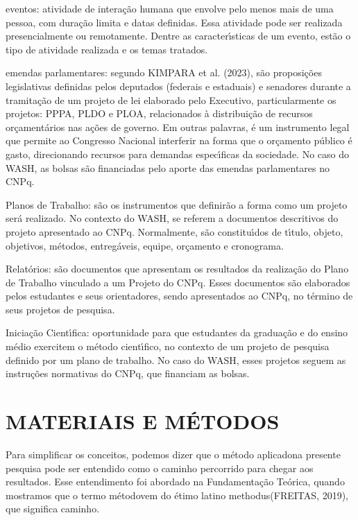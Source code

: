\documentclass[
12pt,		%
openright,	%
twoside,  %
a4paper,			%
chapter=TITLE,		%
english,			%
french,				%
spanish,			%
brazil				%
]{USPSC-classe/USPSC}
\begin{document}
\begin{alineas}
\item eventos: atividade de intera\c{c}\~ao humana que envolve pelo menos mais de uma pessoa, com dura\c{c}\~ao limita e datas definidas. Essa atividade pode ser realizada presencialmente ou remotamente. Dentre as caracter\'{\i}sticas de um evento, est\~ao o tipo de atividade realizada e os temas tratados.
\item emendas parlamentares: segundo  KIMPARA et al. (2023),  \textquotedbl s\~ao proposi\c{c}\~oes legislativas definidas pelos deputados (federais e estaduais) e senadores durante a tramita\c{c}\~ao de um projeto de lei elaborado pelo Executivo, particularmente os projetos: PPPA, PLDO e PLOA\textquotedbl , relacionados \`a distribui\c{c}\~ao de recursos or\c{c}ament\'arios nas a\c{c}\~oes de governo. Em outras palavras, \'e um instrumento legal que permite ao Congresso Nacional interferir na forma que o or\c{c}amento p\'ublico \'e gasto, direcionando recursos para demandas espec\'{\i}ficas da sociedade. No caso do WASH, as bolsas s\~ao financiadas pelo aporte das emendas parlamentares no CNPq.
\item Planos de Trabalho: s\~ao os instrumentos que definir\~ao a forma como um projeto ser\'a realizado. No contexto do WASH, se referem a documentos descritivos do projeto apresentado ao CNPq. Normalmente, s\~ao constitu\'{\i}dos de t\'{\i}tulo, objeto, objetivos, m\'etodos, entreg\'aveis, equipe, or\c{c}amento e cronograma.
\item Relat\'orios: s\~ao documentos que apresentam os resultados da realiza\c{c}\~ao do Plano de Trabalho vinculado a um Projeto do CNPq. Esses documentos s\~ao elaborados pelos estudantes e seus orientadores, sendo apresentados ao CNPq, no t\'ermino de seus projetos de pesquisa.
\item Inicia\c{c}\~ao Cient\'{\i}fica: oportunidade para que estudantes da gradua\c{c}\~ao e do ensino m\'edio exercitem o m\'etodo cient\'{\i}fico, no contexto de um projeto de pesquisa definido por um plano de trabalho. No caso do WASH, esses projetos seguem as instru\c{c}\~oes normativas do CNPq, que financiam as bolsas.
\end{alineas}

\chapter[MATERIAIS E M\'ETODOS]{MATERIAIS E M\'ETODOS}\label{MATERIAIS E M\'ETODOS}
Para simplificar os conceitos, podemos dizer que o \textquotedbl m\'etodo aplicado\textquotedbl  na presente pesquisa pode ser entendido como o \textquotedbl caminho percorrido \textquotedbl  para chegar aos resultados. Esse entendimento  foi abordado  na Fundamenta\c{c}\~ao Te\'orica, quando mostramos que o termo \textquotedbl m\'etodo\textquotedbl  vem do \'etimo latino \textquotedbl methodus\textquotedbl  (FREITAS, 2019), que significa \textquotedbl caminho\textquotedbl .
\end{document}
